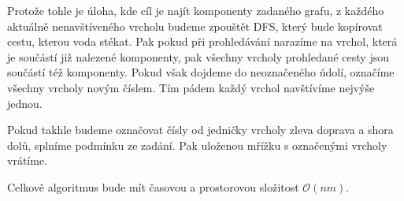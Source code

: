 \documentclass{fkssolpub}
\author{Ondřej Sedláček}
\begin{document}
Protože tohle je úloha, kde cíl je najít komponenty zadaného grafu, z každého
aktuálně nenavštíveného vrcholu budeme zpouštět DFS, který bude kopírovat
cestu, kterou voda stékat. Pak pokud při prohledávání narazíme na vrchol,
která je součástí již nalezené komponenty, pak všechny vrcholy prohledané
cesty jsou součástí též komponenty. Pokud však dojdeme do neoznačeného údolí, označíme
všechny vrcholy novým číslem. Tím pádem každý vrchol navštívíme nejvýše jednou.

Pokud takhle budeme označovat čísly od jedničky vrcholy zleva doprava a shora
dolů, splníme podmínku ze zadání. Pak uloženou mřížku s označenými vrcholy
vrátíme.

Celkově algoritmus bude mít časovou a prostorovou složitost $\mathcal{O}(n m)$.
\end{document}

